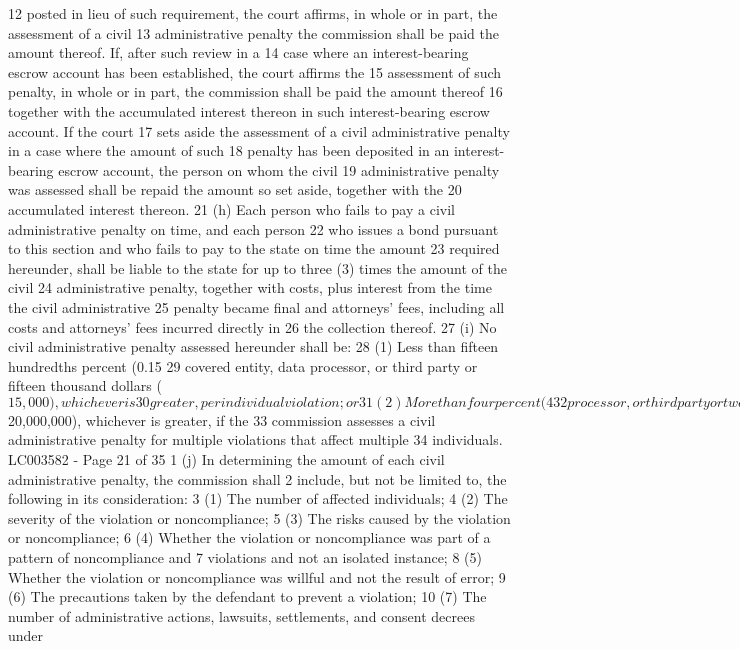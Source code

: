 12 posted in lieu of such requirement, the court affirms, in whole or in part, the assessment of a civil
13 administrative penalty the commission shall be paid the amount thereof. If, after such review in a
14 case where an interest-bearing escrow account has been established, the court affirms the
15 assessment of such penalty, in whole or in part, the commission shall be paid the amount thereof
16 together with the accumulated interest thereon in such interest-bearing escrow account. If the court
17 sets aside the assessment of a civil administrative penalty in a case where the amount of such
18 penalty has been deposited in an interest-bearing escrow account, the person on whom the civil
19 administrative penalty was assessed shall be repaid the amount so set aside, together with the
20 accumulated interest thereon.
21 (h) Each person who fails to pay a civil administrative penalty on time, and each person
22 who issues a bond pursuant to this section and who fails to pay to the state on time the amount
23 required hereunder, shall be liable to the state for up to three (3) times the amount of the civil
24 administrative penalty, together with costs, plus interest from the time the civil administrative
25 penalty became final and attorneys' fees, including all costs and attorneys' fees incurred directly in
26 the collection thereof.
27 (i) No civil administrative penalty assessed hereunder shall be:
28 (1) Less than fifteen hundredths percent (0.15%
29 covered entity, data processor, or third party or fifteen thousand dollars ($15,000), whichever is
30 greater, per individual violation; or
31 (2) More than four percent (4%
32 processor, or third party or twenty million dollars ($20,000,000), whichever is greater, if the
33 commission assesses a civil administrative penalty for multiple violations that affect multiple
34 individuals.
LC003582 - Page 21 of 35
1 (j) In determining the amount of each civil administrative penalty, the commission shall
2 include, but not be limited to, the following in its consideration:
3 (1) The number of affected individuals;
4 (2) The severity of the violation or noncompliance;
5 (3) The risks caused by the violation or noncompliance;
6 (4) Whether the violation or noncompliance was part of a pattern of noncompliance and
7 violations and not an isolated instance;
8 (5) Whether the violation or noncompliance was willful and not the result of error;
9 (6) The precautions taken by the defendant to prevent a violation;
10 (7) The number of administrative actions, lawsuits, settlements, and consent decrees under
